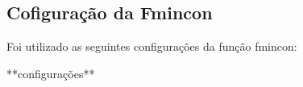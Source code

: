 


    
    

    

    
    
    
    
    
    
    
    
    


\subsection{Cofiguração da Fmincon}
Foi utilizado as seguintes configurações da função fmincon:

**configurações**

